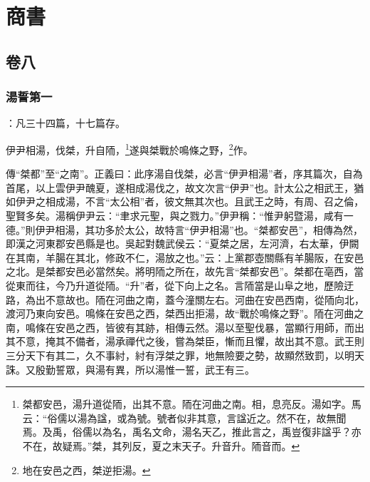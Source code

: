 


\part{商書}


\chapter{卷八}


\section{湯誓第一}


 {\noindent\zhuan{}\fzbyks {}：凡三十四篇，十七篇存。\par}

伊尹相湯，伐桀，升自陑，\footnote{桀都安邑，湯升道從陑，出其不意。陑在河曲之南。相，息亮反。湯如字。馬云：“俗儒以湯為諡，或為號。號者似非其意，言諡近之。然不在，故無聞焉。及禹，俗儒以為名，禹名文命，湯名天乙，推此言之，禹豈復非諡乎？亦不在，故疑焉。”桀，其列反，夏之末天子。升音升。陑音而。}遂與桀戰於鳴條之野，\footnote{地在安邑之西，桀逆拒湯。}作。


{\noindent\zhuan{}\fzbyks 傳“桀都”至“之南”。正義曰：此序湯自伐桀，必言“伊尹相湯”者，序其篇次，自為首尾，以上雲伊尹醜夏，遂相成湯伐之，故文次言“伊尹”也。計太公之相武王，猶如伊尹之相成湯，不言“太公相”者，彼文無其次也。且武王之時，有周、召之倫，聖賢多矣。湯稱伊尹云：“聿求元聖，與之戮力。”伊尹稱：“惟尹躬暨湯，咸有一德。”則伊尹相湯，其功多於太公，故特言“伊尹相湯”也。“桀都安邑”，相傳為然，即漢之河東郡安邑縣是也。吳起對魏武侯云：“夏桀之居，左河濟，右太華，伊闕在其南，羊腸在其北，修政不仁，湯放之也。”云：上黨郡壺關縣有羊腸阪，在安邑之北。是桀都安邑必當然矣。將明陑之所在，故先言“桀都安邑”。桀都在亳西，當從東而往，今乃升道從陑。“升”者，從下向上之名。言陑當是山阜之地，歷險迂路，為出不意故也。陑在河曲之南，蓋今潼關左右。河曲在安邑西南，從陑向北，渡河乃東向安邑。鳴條在安邑之西，桀西出拒湯，故“戰於鳴條之野”。陑在河曲之南，鳴條在安邑之西，皆彼有其跡，相傳云然。湯以至聖伐暴，當顯行用師，而出其不意，掩其不備者，湯承禪代之後，嘗為桀臣，慚而且懼，故出其不意。武王則三分天下有其二，久不事紂，紂有浮桀之罪，地無險要之勢，故顯然致罰，以明天誅。又殷勤誓眾，與湯有異，所以湯惟一誓，武王有三。 \par}

